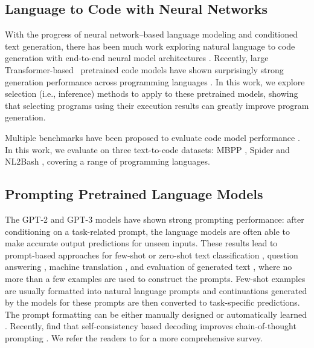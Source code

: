 \documentclass[11pt]{article}
\newcommand{\interalia}[1]{\citep[\textit{inter alia}]{#1}}
\begin{document}
\subsection{Language to Code with Neural Networks}
\label{sec:related-lm-synthesis}
With the progress of neural network--based language modeling and conditioned text generation, there has been much work exploring natural language to code generation with end-to-end neural model architectures \interalia{xiao-etal-2016-sequence,ling-etal-2016-latent,rabinovich-etal-2017-abstract,dong-lapata-2018-coarse,suhr-etal-2018-learning,xu-etal-2020-incorporating,lachaux2021dobf}. 
Recently, large Transformer-based~\citep{vaswani2017attention} pretrained code models have shown surprisingly strong generation performance across programming languages \interalia{chen2021evaluating,austin2021program,li2022competition}. In this work, we explore selection (i.e., inference) methods to apply to these pretrained models, showing that selecting programs using their execution results can greatly improve program generation. 

Multiple benchmarks have been proposed to evaluate code model performance \interalia{miceli-barone-sennrich-2017-parallel,yin2018learning,hendrycks2021measuring,lu2021codexglue}. In this work, we evaluate on three text-to-code datasets: MBPP \citep[Python;][]{austin2021program}, Spider \citep[SQL;][]{yu-etal-2018-spider} and NL2Bash \citep[Bash;][]{lin-etal-2018-nl2bash}, covering a range of programming languages. 

\subsection{Prompting Pretrained Language Models}
The GPT-2 \citep{radford2019language} and GPT-3 \citep{brown2020language} models have shown strong prompting performance: after conditioning on a task-related prompt, the language models are often able to make accurate output predictions for unseen inputs. These results lead to prompt-based approaches for few-shot or zero-shot text classification \interalia{shin-etal-2020-autoprompt,gao-etal-2021-making,min2021noisy}, question answering \citep{khashabi-etal-2020-unifiedqa}, machine translation \citep{radford2019language}, and evaluation of generated text \citep{yuan2021bartscore}, where no more than a few examples are used to construct the prompts. Few-shot examples are usually formatted into natural language prompts and continuations generated by the models for these prompts are then converted to task-specific predictions. The prompt formatting can be either manually designed \citep{jiang-etal-2020-know} or automatically learned \citep{li-liang-2021-prefix,lester-etal-2021-power}. Recently, \citet{wang2022self} find that self-consistency based decoding improves chain-of-thought prompting \citep{wei2022chain}.
We refer the readers to \citet{liu2021pre} for a more comprehensive survey. 
\end{document}
